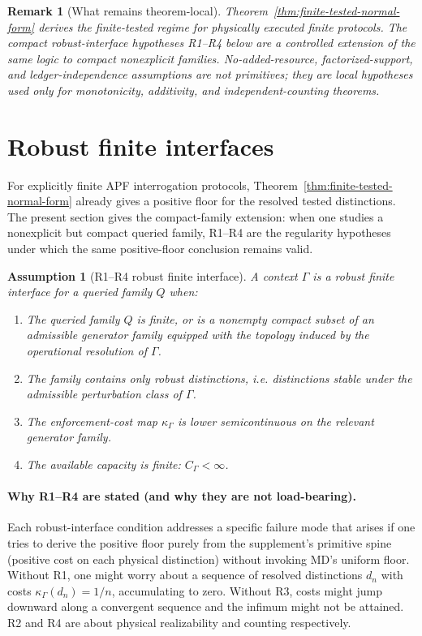 \documentclass[11pt]{article}
\newtheorem{assumption}[theorem]{Assumption}
\newtheorem{remark}[theorem]{Remark}
\begin{document}
\begin{remark}[What remains theorem-local]\label{rem:what-remains-theorem-local}
Theorem~\ref{thm:finite-tested-normal-form} derives the finite-tested regime for physically executed finite protocols.  The compact robust-interface hypotheses R1--R4 below are a controlled extension of the same logic to compact nonexplicit families.  No-added-resource, factorized-support, and ledger-independence assumptions are not primitives; they are local hypotheses used only for monotonicity, additivity, and independent-counting theorems.
\end{remark}

\section{Robust finite interfaces}\label{sec:robust-finite}

For explicitly finite APF interrogation protocols, Theorem~\ref{thm:finite-tested-normal-form} already gives a positive floor for the resolved tested distinctions.  The present section gives the compact-family extension: when one studies a nonexplicit but compact queried family, R1--R4 are the regularity hypotheses under which the same positive-floor conclusion remains valid.

\begin{assumption}[R1--R4 robust finite interface]
A context $\Gamma$ is a \emph{robust finite interface} for a queried family $Q$ when:
\begin{enumerate}[label=R\arabic*.,leftmargin=2em]
\item The queried family $Q$ is finite, or is a nonempty compact subset of an admissible generator family equipped with the topology induced by the operational resolution of $\Gamma$.
\item The family contains only robust distinctions, i.e. distinctions stable under the admissible perturbation class of $\Gamma$.
\item The enforcement-cost map $\kappa_\Gamma$ is lower semicontinuous on the relevant generator family.
\item The available capacity is finite: $C_\Gamma<\infty$.
\end{enumerate}
\end{assumption}

\paragraph{Why R1--R4 are stated (and why they are not load-bearing).}
Each robust-interface condition addresses a specific failure mode that arises if one tries to derive the positive floor purely from the supplement's primitive spine (positive cost on each physical distinction) without invoking MD's uniform floor.  Without R1, one might worry about a sequence of resolved distinctions $d_n$ with costs $\kappa_\Gamma(d_n)=1/n$, accumulating to zero.  Without R3, costs might jump downward along a convergent sequence and the infimum might not be attained.  R2 and R4 are about physical realizability and counting respectively.
\end{document}
